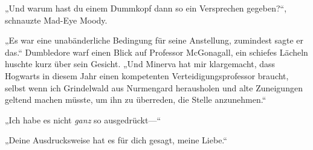 „Und warum hast du einem Dummkopf dann so ein Versprechen gegeben?“, schnauzte Mad-Eye Moody.

„Es war eine unabänderliche Bedingung für seine Anstellung, zumindest sagte er das.“ Dumbledore warf einen Blick auf Professor McGonagall, ein schiefes Lächeln huschte kurz über sein Gesicht. „Und Minerva hat mir klargemacht, dass Hogwarts in diesem Jahr einen kompetenten Verteidigungsprofessor braucht, selbst wenn ich Grindelwald aus Nurmengard herausholen und alte Zuneigungen geltend machen müsste, um ihn zu überreden, die Stelle anzunehmen.“

„Ich habe es nicht \emph{ganz} so ausgedrückt—“

„Deine Ausdrucksweise hat es für dich gesagt, meine Liebe.“


